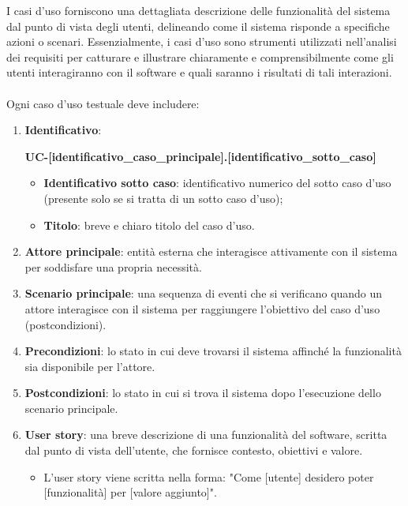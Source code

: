 I casi d'uso forniscono una dettagliata descrizione delle funzionalità del sistema dal punto di vista degli utenti, delineando come il sistema risponde a specifiche azioni o scenari.
Essenzialmente, i casi d'uso sono strumenti utilizzati nell'analisi dei requisiti per catturare e illustrare chiaramente e comprensibilmente come gli utenti interagiranno con il software e quali saranno i risultati di tali interazioni. \\
\\
Ogni caso d'uso testuale deve includere:
\begin{enumerate}
	\item \textbf{Identificativo}:
	      \begin{center}
		      \textbf{UC-[identificativo\_caso\_principale].[identificativo\_sotto\_caso]}
	      \end{center}
	      \begin{itemize}
		      \item \textbf{Identificativo sotto caso}: identificativo numerico del sotto caso d'uso (presente solo se si tratta di un sotto caso d'uso);
		      \item \textbf{Titolo}: breve e chiaro titolo del caso d'uso.
	      \end{itemize}
	\item \textbf{Attore principale}: entità esterna che interagisce attivamente con il sistema per soddisfare una propria necessità.
	\item \textbf{Scenario principale}: una sequenza di eventi che si verificano quando un attore interagisce con il sistema per raggiungere l'obiettivo del caso d'uso (postcondizioni).
	\item \textbf{Precondizioni}: lo stato in cui deve trovarsi il sistema affinché la funzionalità sia disponibile per l'attore.
	\item \textbf{Postcondizioni}: lo stato in cui si trova il sistema dopo l'esecuzione dello scenario principale.
	\item \textbf{User story}: una breve descrizione di una funzionalità del software, scritta dal punto di vista dell'utente, che fornisce contesto, obiettivi e valore.
	      \begin{itemize}
		      \item L'user story viene scritta nella forma: "Come [utente] desidero poter [funzionalità] per [valore aggiunto]".
	      \end{itemize}
\end{enumerate}

